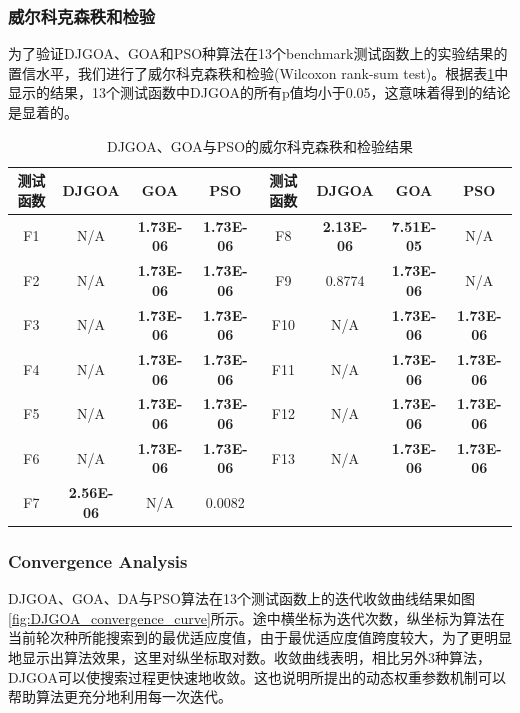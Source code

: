 \subsubsection{威尔科克森秩和检验}
为了验证DJGOA、GOA和PSO种算法在13个benchmark测试函数上的实验结果的置信水平，我们进行了威尔科克森秩和检验(Wilcoxon rank-sum test)。根据表\ref{tab:wilcoxon_rank_sum_test_DJGOA}中显示的结果，13个测试函数中DJGOA的所有p值均小于0.05，这意味着得到的结论是显着的。
\begin{table}[!htbp]
    \centering
    \caption{DJGOA、GOA与PSO的威尔科克森秩和检验结果}
    \label{tab:wilcoxon_rank_sum_test_DJGOA}
    \renewcommand\arraystretch{1.5} 
\begin{tabular}{c c c c || c c c c}
  \hline
  测试函数 & DJGOA & GOA & PSO &测试函数 & DJGOA & GOA & PSO\\
  \hline
  F1 & N/A & \textbf{1.73E-06}&\textbf{1.73E-06}&F8 & \textbf{2.13E-06} & \textbf{7.51E-05}&N/A \\
  \hline
  F2 & N/A & \textbf{1.73E-06}&\textbf{1.73E-06}&F9 & 0.8774 &\textbf{1.73E-06} &N/A \\
  \hline
  F3 & N/A & \textbf{1.73E-06}&\textbf{1.73E-06}&F10 & N/A & \textbf{1.73E-06}&\textbf{1.73E-06} \\
  \hline
  F4 & N/A & \textbf{1.73E-06}&\textbf{1.73E-06}&F11 & N/A & \textbf{1.73E-06}&\textbf{1.73E-06} \\
  \hline
  F5 & N/A & \textbf{1.73E-06}&\textbf{1.73E-06}&F12 & N/A & \textbf{1.73E-06}&\textbf{1.73E-06} \\
  \hline
  F6 & N/A & \textbf{1.73E-06}&\textbf{1.73E-06}&F13 & N/A & \textbf{1.73E-06}&\textbf{1.73E-06} \\
  \hline
  F7 & \textbf{2.56E-06} & N/A&0.0082&  &   &  &  \\
  \hline
  
  \hline
\end{tabular}
\end{table}


\subsubsection{Convergence Analysis}
DJGOA、GOA、DA与PSO算法在13个测试函数上的迭代收敛曲线结果如图\ref{fig:DJGOA_convergence_curve}所示。途中横坐标为迭代次数，纵坐标为算法在当前轮次种所能搜索到的最优适应度值，由于最优适应度值跨度较大，为了更明显地显示出算法效果，这里对纵坐标取对数。收敛曲线表明，相比另外3种算法，DJGOA可以使搜索过程更快速地收敛。这也说明所提出的动态权重参数机制可以帮助算法更充分地利用每一次迭代。

